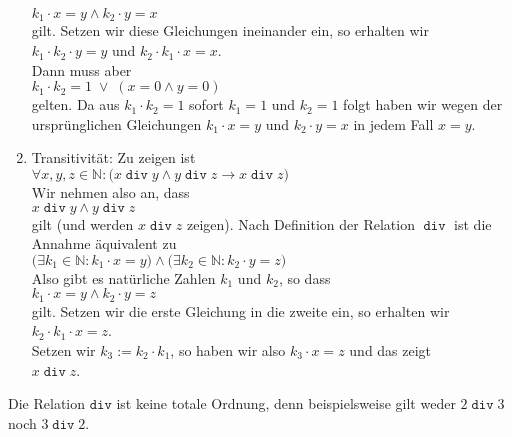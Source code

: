 \begin{enumerate}
      $k_1 \cdot x = y \wedge k_2 \cdot y = x$
      \\[0.2cm]
      gilt.  Setzen wir diese Gleichungen ineinander ein, so erhalten wir 
      \\[0.2cm]
      \hspace*{1.3cm}
      $k_1 \cdot k_2 \cdot y = y$ \quad und \quad
      $k_2 \cdot k_1 \cdot x = x$.
      \\[0.2cm] 
      Dann muss aber 
      \\[0.2cm]
      \hspace*{1.3cm}
      $k_1 \cdot k_2 = 1 \;\vee\; (x = 0 \wedge y = 0)$
      \\[0.2cm]
      gelten.  Da aus $k_1 \cdot k_2 = 1$ sofort $k_1 = 1$ und $k_2 = 1$ folgt
      haben wir wegen der ursprünglichen Gleichungen $k_1 \cdot x = y$ und $k_2 \cdot y = x$
      in jedem Fall $x = y$.
\item Transitivität: Zu zeigen ist 
      \\[0.2cm]
      \hspace*{1.3cm}
      $\forall x, y, z \in \mathbb{N}:\bigl( x \mathop{\mathtt{div}} y \wedge y \mathop{\mathtt{div}} z \rightarrow x \mathop{\mathtt{div}} z\bigr)$
      \\[0.2cm] 
      Wir nehmen also an, dass 
      \\[0.2cm]
      \hspace*{1.3cm}
      $x \mathop{\mathtt{div}} y \wedge y \mathop{\mathtt{div}} z$
      \\[0.2cm]
      gilt (und werden $x \mathop{\mathtt{div}} z$ zeigen).  Nach Definition der Relation $\mathop{\mathtt{div}}$
      ist die Annahme äquivalent zu 
      \\[0.2cm]
      \hspace*{1.3cm}
      $\bigl(\exists k_1 \in \mathbb{N}: k_1 \cdot x = y \bigr) \wedge
       \bigl(\exists k_2 \in \mathbb{N}: k_2 \cdot y = z \bigr)$ 
      \\[0.2cm]
      Also gibt es natürliche Zahlen $k_1$ und $k_2$, so dass 
      \\[0.2cm]
      \hspace*{1.3cm}
      $k_1 \cdot x = y \wedge k_2 \cdot y = z$
      \\[0.2cm]
      gilt.  Setzen wir die erste Gleichung in die zweite  ein, so erhalten wir 
      \\[0.2cm]
      \hspace*{1.3cm}
      $k_2 \cdot k_1 \cdot x = z$.
      \\[0.2cm] 
      Setzen wir $k_3 := k_2 \cdot k_1$, so haben wir also $k_3 \cdot x = z$
      und das zeigt 
      \\[0.2cm]
      \hspace*{1.3cm}
      $x \mathop{\mathtt{div}} z$.
\end{enumerate}
Die Relation $\mathtt{div}$ ist keine totale Ordnung, denn beispielsweise gilt weder
$2 \mathop{\mathtt{div}} 3$ noch $3 \mathop{\mathtt{div}} 2$.  \exend

